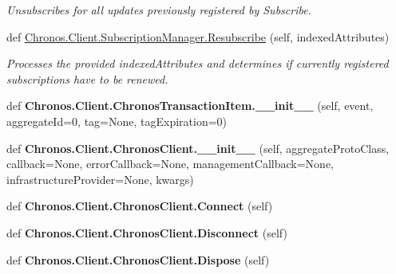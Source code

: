 \begin{DoxyCompactItemize}
\begin{DoxyCompactList}\small\item\em Unsubscribes for all updates previously registered by Subscribe. \end{DoxyCompactList}\item 
def \hyperlink{group__Chronos_ga8c7e61cf993d0b145642c632f064921d}{Chronos.\+Client.\+Subscription\+Manager.\+Resubscribe} (self, indexed\+Attributes)
\begin{DoxyCompactList}\small\item\em Processes the provided {\ttfamily indexed\+Attributes} and determines if currently registered subscriptions have to be renewed. \end{DoxyCompactList}\item 
def {\bfseries Chronos.\+Client.\+Chronos\+Transaction\+Item.\+\_\+\+\_\+init\+\_\+\+\_\+} (self, event, aggregate\+Id=0, tag=None, tag\+Expiration=0)\hypertarget{group__Chronos_gac76d1c9b3c648f29dcd5bcb5b0789a93}{}\label{group__Chronos_gac76d1c9b3c648f29dcd5bcb5b0789a93}

\item 
def {\bfseries Chronos.\+Client.\+Chronos\+Client.\+\_\+\+\_\+init\+\_\+\+\_\+} (self, aggregate\+Proto\+Class, callback=None, error\+Callback=None, management\+Callback=None, infrastructure\+Provider=None, kwargs)\hypertarget{group__Chronos_ga6b3a37017431d8f5a25874e21183ad43}{}\label{group__Chronos_ga6b3a37017431d8f5a25874e21183ad43}

\item 
def {\bfseries Chronos.\+Client.\+Chronos\+Client.\+Connect} (self)\hypertarget{group__Chronos_ga148c8cd560834cc5065d0dec791b3806}{}\label{group__Chronos_ga148c8cd560834cc5065d0dec791b3806}

\item 
def {\bfseries Chronos.\+Client.\+Chronos\+Client.\+Disconnect} (self)\hypertarget{group__Chronos_ga588c48c09f0f2e7df4707c816257a968}{}\label{group__Chronos_ga588c48c09f0f2e7df4707c816257a968}

\item 
def {\bfseries Chronos.\+Client.\+Chronos\+Client.\+Dispose} (self)\hypertarget{group__Chronos_ga97751ba3d2360b3f0f922f05c52ddb05}{}\label{group__Chronos_ga97751ba3d2360b3f0f922f05c52ddb05}


\end{DoxyCompactItemize}
